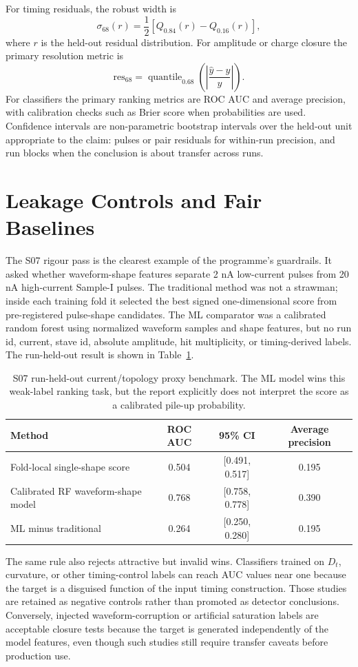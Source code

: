 For timing residuals, the robust width is
\[
  \sigma_{68}(r)=\frac{1}{2}\left[Q_{0.84}(r)-Q_{0.16}(r)\right],
\]
where \(r\) is the held-out residual distribution. For amplitude or charge closure the primary resolution metric is
\[
  \mathrm{res}_{68}=\operatorname{quantile}_{0.68}
  \left(\left|\frac{\hat{y}-y}{y}\right|\right).
\]
For classifiers the primary ranking metrics are ROC AUC and average precision, with calibration checks such as Brier score when probabilities are used. Confidence intervals are non-parametric bootstrap intervals over the held-out unit appropriate to the claim: pulses or pair residuals for within-run precision, and run blocks when the conclusion is about transfer across runs.

\section{Leakage Controls and Fair Baselines}

The S07 rigour pass is the clearest example of the programme's guardrails. It asked whether waveform-shape features separate 2 nA low-current pulses from 20 nA high-current Sample-I pulses. The traditional method was not a strawman; inside each training fold it selected the best signed one-dimensional score from pre-registered pulse-shape candidates. The ML comparator was a calibrated random forest using normalized waveform samples and shape features, but no run id, current, stave id, absolute amplitude, hit multiplicity, or timing-derived labels. The run-held-out result is shown in Table~\ref{tab:s07-rigour}.

\begin{table}[H]
\centering
\caption{S07 run-held-out current/topology proxy benchmark. The ML model wins this weak-label ranking task, but the report explicitly does not interpret the score as a calibrated pile-up probability.}
\label{tab:s07-rigour}
\begin{tabular}{lccc}
\toprule
Method & ROC AUC & 95\% CI & Average precision \\
\midrule
Fold-local single-shape score & 0.504 & [0.491, 0.517] & 0.195 \\
Calibrated RF waveform-shape model & 0.768 & [0.758, 0.778] & 0.390 \\
ML minus traditional & 0.264 & [0.250, 0.280] & 0.195 \\
\bottomrule
\end{tabular}
\end{table}

The same rule also rejects attractive but invalid wins. Classifiers trained on \(D_t\), curvature, or other timing-control labels can reach AUC values near one because the target is a disguised function of the input timing construction. Those studies are retained as negative controls rather than promoted as detector conclusions. Conversely, injected waveform-corruption or artificial saturation labels are acceptable closure tests because the target is generated independently of the model features, even though such studies still require transfer caveats before production use.

